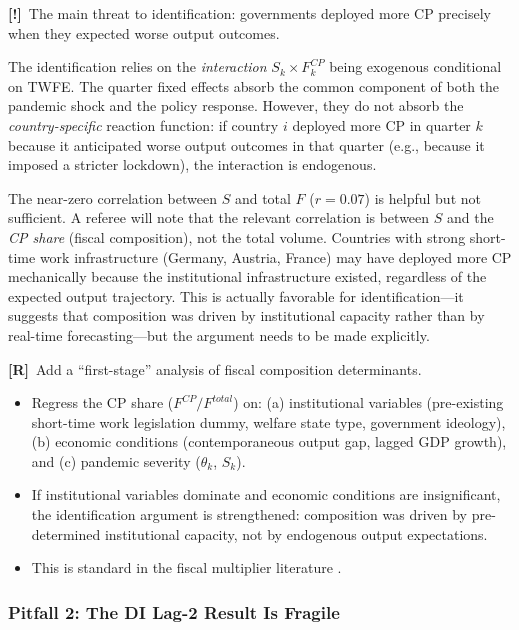 \documentclass[12pt, a4paper]{article}
\newcommand{\concern}[1]{\textcolor{concern}{\textbf{[!]}~#1}}
\newcommand{\recommend}[1]{\textcolor{recommend}{\textbf{[R]}~#1}}
\begin{document}
\concern{The main threat to identification: governments deployed more CP precisely when they expected worse output outcomes.}

The identification relies on the \textit{interaction} $S_k \times F_k^{CP}$ being exogenous conditional on TWFE. The quarter fixed effects absorb the common component of both the pandemic shock and the policy response. However, they do not absorb the \textit{country-specific} reaction function: if country $i$ deployed more CP in quarter $k$ because it anticipated worse output outcomes in that quarter (e.g., because it imposed a stricter lockdown), the interaction is endogenous.

The near-zero correlation between $S$ and total $F$ ($r = 0.07$) is helpful but not sufficient. A referee will note that the relevant correlation is between $S$ and the \textit{CP share} (fiscal composition), not the total volume. Countries with strong short-time work infrastructure (Germany, Austria, France) may have deployed more CP mechanically because the institutional infrastructure existed, regardless of the expected output trajectory. This is actually favorable for identification---it suggests that composition was driven by institutional capacity rather than by real-time forecasting---but the argument needs to be made explicitly.

\recommend{Add a ``first-stage'' analysis of fiscal composition determinants.}
\begin{itemize}
    \item Regress the CP share ($F^{CP} / F^{total}$) on: (a) institutional variables (pre-existing short-time work legislation dummy, welfare state type, government ideology), (b) economic conditions (contemporaneous output gap, lagged GDP growth), and (c) pandemic severity ($\theta_k$, $S_k$).
    \item If institutional variables dominate and economic conditions are insignificant, the identification argument is strengthened: composition was driven by pre-determined institutional capacity, not by endogenous output expectations.
    \item This is standard in the fiscal multiplier literature \citep{ramey2011, auerbach2012}.
\end{itemize}


\subsubsection*{Pitfall 2: The DI Lag-2 Result Is Fragile}
\end{document}
